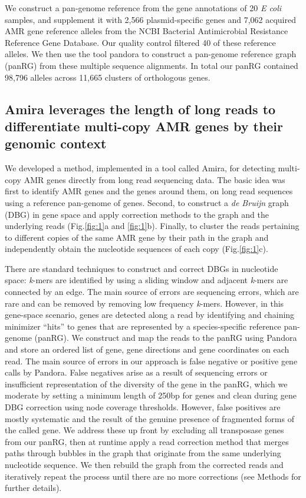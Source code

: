 We construct a pan-genome reference from the gene annotations of 20 \textit{E coli} samples, and supplement it with 2,566 plasmid-specific genes and 7,062 acquired AMR gene reference alleles from the NCBI Bacterial Antimicrobial Resistance Reference Gene Database. Our quality control filtered 40 of these reference alleles. We then use the tool pandora to construct a pan-genome reference graph (panRG) from these multiple sequence alignments.  In total our panRG contained 98,796 alleles across 11,665 clusters of orthologous genes.

\subsection*{Amira leverages the length of long reads to differentiate multi-copy AMR genes by their genomic context}

We developed a method, implemented in a tool called Amira, for detecting multi-copy AMR genes directly from long read sequencing data. The basic idea was first to identify AMR  genes and the genes around them, on long read sequences using a reference pan-genome of genes. Second, to construct a \textit{de Bruijn} graph (DBG) in gene space and apply correction methods to the graph and the underlying reads (Fig.\ref{fig:1}a and \ref{fig:1}b). Finally, to cluster the reads pertaining to different copies of the same AMR gene by their path in the graph and independently obtain the nucleotide sequences of each copy (Fig.\ref{fig:1}c).

There are standard techniques to construct and correct DBGs in nucleotide space: \textit{k}-mers are identified by using a sliding window and adjacent \textit{k}-mers are connected by an edge. The main source of errors are sequencing errors, which are rare and can be removed by removing low frequency \textit{k}-mers. However, in this gene-space scenario, genes are detected along a read by identifying and chaining minimizer “hits” to genes that are represented by a species-specific reference pan-genome (panRG). We construct and map the reads to the panRG using Pandora and store an ordered list of gene, gene directions and gene coordinates on each read. The main source of errors in our approach is false negative or positive gene calls by Pandora. False negatives arise as a result of sequencing errors or insufficient representation of the diversity of the gene in the panRG, which we moderate by setting a minimum length of 250bp for genes and clean during gene DBG correction using node coverage thresholds. However, false positives are mostly systematic and the result of the genuine presence of fragmented forms of the called gene. We address these up front by excluding all transposase genes from our panRG, then at runtime apply a read correction method that merges paths through bubbles in the graph that originate from the same underlying nucleotide sequence. We then rebuild the graph from the corrected reads and iteratively repeat the process until there are no more corrections (see Methods for further details).

